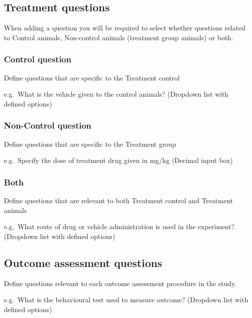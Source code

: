 \documentclass[
]{book}
\begin{document}
\hypertarget{treatment-questions}{%
\subsection{Treatment questions}\label{treatment-questions}}

When adding a question you will be required to select whether questions related to Control animals, Non-control animals (treatment group animals) or both.

\hypertarget{control-question-1}{%
\subsubsection{Control question}\label{control-question-1}}

Define questions that are specific to the Treatment control

e.g.~What is the vehicle given to the control animals?
(Dropdown list with defined options)

\hypertarget{non-control-question-1}{%
\subsubsection{Non-Control question}\label{non-control-question-1}}

Define questions that are specific to the Treatment group

e.g.~Specify the dose of treatment drug given in mg/kg
(Decimal input box)

\hypertarget{both-1}{%
\subsubsection{Both}\label{both-1}}

Define questions that are relevant to both Treatment control and Treatment animals

e.g.~What route of drug or vehicle administration is used in the experiment?
(Dropdown list with defined options)

\hypertarget{outcome-assessment-questions}{%
\subsection{Outcome assessment questions}\label{outcome-assessment-questions}}

Define questions relevant to each outcome assessment procedure in the study.

e.g.~What is the behavioural test used to measure outcome?
(Dropdown list with defined options)
\end{document}
